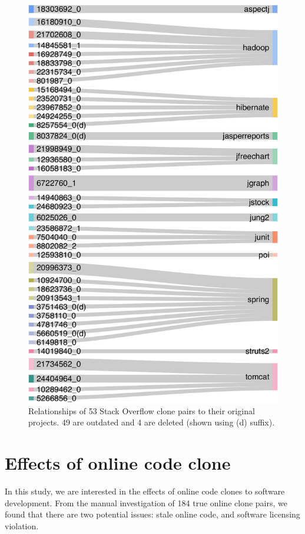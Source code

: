 \documentclass{sig-alternate-05-2015}
\begin{document}
\begin{figure}
	\centering
	\includegraphics[width=0.8\linewidth]{Sankey_proj}
	\caption{Relationships of 53 Stack Overflow clone pairs to their original projects. 49 are outdated and 4 are deleted (shown using (d) suffix).}
	\label{fig:sankey}
\end{figure}


\section{Effects of online code clone}

In this study, we are interested in the effects of online code clones to software development. From the manual investigation of 184 true online clone pairs, we found that there are two potential issues: stale online code, and software licensing violation.
\end{document}
